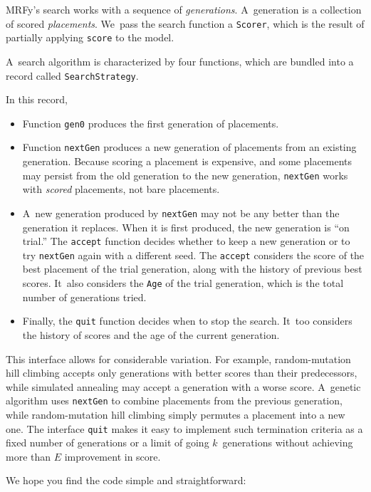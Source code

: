 \documentclass[preprint,nonatbib,blockstyle,nocopyrightspace,times]{sigplanconf}
\newcommand\smallverbatiminput[1]{{\par\unskip\small}}
\begin{document}
MRFy's search works with a sequence of \emph{generations}.
A~generation is a collection of scored \emph{placements}.
We~pass the
search function a \texttt{Scorer}, which is the result of partially
applying \texttt{score} to the model.
\smallverbatiminput{scoredecl}
A~search algorithm is characterized by four functions, which are
bundled into a record called \texttt{SearchStrategy}.
\smallverbatiminput{strategy}
In this record,
\begin{itemize}
\item
Function \texttt{gen0} produces the first generation of placements.
\item
Function \texttt{nextGen} produces a new generation of placements from
an existing generation.
Because scoring a placement is expensive, 
and some placements may persist from the old generation to the new
generation, \texttt{nextGen} works with \emph{scored} placements, not
bare placements.
\item
A~new generation produced by \texttt{nextGen} may not be any better
than the generation it replaces.
When it is first produced, the new generation is ``on trial.''
The \texttt{accept} function decides whether to keep a new generation
or to try \texttt{nextGen} again with a different seed.
The \texttt{accept} considers the score of the best
placement of the trial generation, along with the history of previous
best scores.
It~also considers the \texttt{Age} of the trial generation, which is
the total number of 
generations tried.
\item
Finally, the \texttt{quit} function decides when to stop the search.
It~too considers the history of scores and the age of the current
generation. 
\end{itemize}
This interface allows for considerable variation.
For example, random-mutation hill climbing accepts only generations
with better scores than their predecessors,
while simulated annealing may accept a generation with a worse score.
A~genetic algorithm uses \texttt{nextGen} to
combine placements from the previous generation, while
random-mutation
hill climbing simply permutes a placement into a new one.
The interface \texttt{quit} makes it easy
to implement such termination criteria as a fixed number of generations
or a limit of going $k$~generations without achieving more than $E$
improvement in score. 

We hope you find the code simple and straightforward:
\smallverbatiminput{search}
\end{document}
